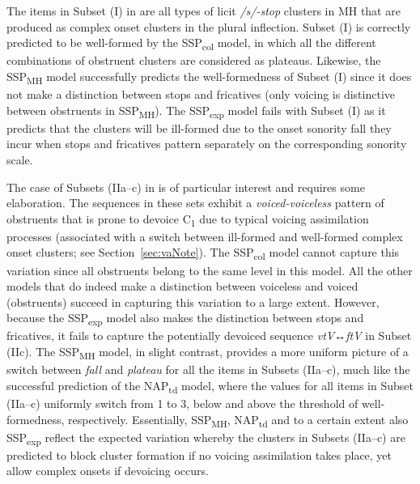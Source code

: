 The items in Subset (I) in  are all types of licit \emph{/s/-stop} clusters in MH that are produced as complex onset clusters in the plural inflection. Subset (I) is correctly predicted to be well-formed by the SSP\textsubscript{col} model, in which all the different combinations of obstruent clusters are considered as plateaus. Likewise, the SSP\textsubscript{MH} model successfully predicts the well-formedness of Subset (I) since it does not make a distinction between stops and fricatives (only voicing is distinctive between obstruents in SSP\textsubscript{MH}). The SSP\textsubscript{exp} model fails with Subset (I) as it predicts that the clusters will be ill-formed due to the onset sonority fall they incur when stops and fricatives pattern separately on the corresponding sonority scale.

The case of Subsets (IIa--c) in  is of particular interest and requires some elaboration. The sequences in these sets exhibit a \emph{voiced-voiceless} pattern of obstruents that is prone to devoice C\textsubscript{1} due to typical voicing assimilation processes (associated with a switch between ill-formed and well-formed complex onset clusters; see Section~\ref{sec:vaNote}). The SSP\textsubscript{col} model cannot capture this variation since all obstruents belong to the same level in this model. All the other models that do indeed make a distinction between voiceless and voiced (obstruents) succeed in capturing this variation to a large extent. However, because the SSP\textsubscript{exp} model also makes the distinction between stops and fricatives, it fails to capture the potentially devoiced sequence \emph{vtV}↔\emph{ftV} in Subset (IIc).
The SSP\textsubscript{MH} model, in slight contrast, provides a more uniform picture of a switch between \emph{fall} and \emph{plateau} for all the items in Subsets (IIa--c), much like the successful prediction of the NAP\textsubscript{td} model, where the values for all items in Subset (IIa--c) uniformly switch from 1 to 3, below and above the threshold of well-formedness, respectively. 
Essentially, SSP\textsubscript{MH}, NAP\textsubscript{td} and to a certain extent also SSP\textsubscript{exp} reflect the expected variation whereby the clusters in Subsets (IIa--c) are predicted to block cluster formation if no voicing assimilation takes place, yet allow complex onsets if devoicing occurs.

